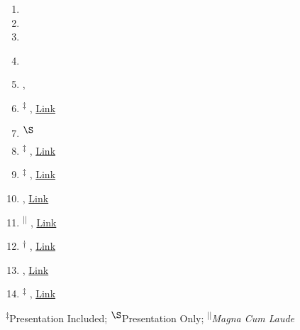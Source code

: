 
\normalsize
\begin{center}
\begin{minipage}{0.95\textwidth}
	\begin{enumerate}[leftmargin=5mm,itemsep=2mm]
	\item {}
	\item {}
	\item {}
	\item {} \label{ans_2012_paper}

	\item {}, \label{ieee_nss_paper}
	\item \textsuperscript{$\ddagger$}  , 
		\href{https://laws.lanl.gov/vhosts/mcnp.lanl.gov/pdf_files/la-ur-17-20353.pdf}{Link}   \label{ans_summer2017_paper}
	\item \textsuperscript{$\S$}  \label{ans_summer2017_jrt_paper}
	\item \textsuperscript{$\ddagger$}  , 
		\href{https://app.box.com/s/kbe3jlwsq0qxcyrirneqpodl3mqoz3n3}{Link}\label{caari_2016_paper_1}
	\item \textsuperscript{$\ddagger$}  , 
		\href{https://app.box.com/s/sqx0ddl77lg0vue0ahffhdr9pclmlybi}{Link}\label{caari_2016_paper_2}
	\item  {}, 
		\href{https://app.box.com/s/raujd5ok40d45qaeq3lx2r6akdv8xfqx}{Link}\label{ans_winter2016_paper}
	\item \textsuperscript{$||$}   , 
		\href{http://cds.ismrm.org/protected/16MPresentations/abstracts/1108.html}{Link}\label{ismrm_2016_paper}
	\item \textsuperscript{$\dagger$} , 
		\href{https://app.box.com/s/yc0aft4oafsgg6f6qhzjpvbgouql0lle}{Link}\label{cmrr_2015_paper}
        \item {}, 
		\href{https://app.box.com/s/bj7sbfqana8sixv70nu6afa5i5mfuamt}{Link}\label{ismrm_2014_paper}
	\item \textsuperscript{$\ddagger$}  , 
		\href{https://app.box.com/s/rqnshtxi4umq1lm2m5g7fcd16m1ztap0}{Link}\label{abaqus_2012_paper}
   \end{enumerate}
\end{minipage}
\end{center}

\footnotesize
\begin{center}
\textsuperscript{$\ddagger$}Presentation Included; \textsuperscript{$\S$}Presentation Only; \textsuperscript{$||$}\textit{Magna Cum Laude}
\end{center}

